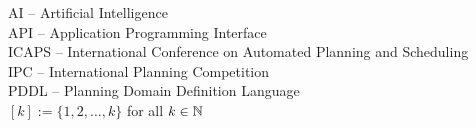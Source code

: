 AI -- Artificial Intelligence\\
API -- Application Programming Interface\\
ICAPS -- International Conference on Automated Planning and Scheduling\\
IPC -- International Planning Competition\\
PDDL -- Planning Domain Definition Language\\
$[k] := \{1, 2, \ldots, k\}$ for all $k \in \mathbb{N}$\\
